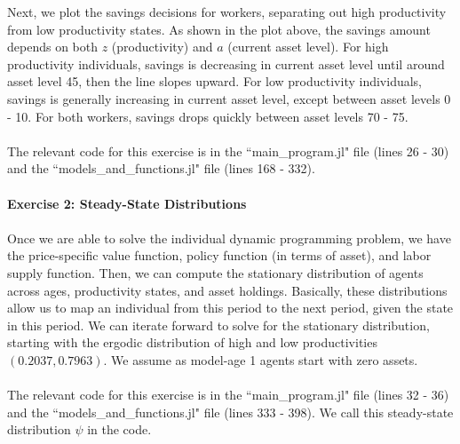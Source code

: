 \documentclass[12pt]{article}
\begin{document}
\noindent Next, we plot the savings decisions for workers, separating out high productivity from low productivity states. As shown in the plot above, the savings amount depends on both $z$ (productivity) and $a$ (current asset level). For high productivity individuals, savings is decreasing in current asset level until around asset level 45, then the line slopes upward. For low productivity individuals, savings is generally increasing in current asset level, except between asset levels 0 - 10. For both workers, savings drops quickly between asset levels 70 - 75. \\\\
The relevant code for this exercise is in the ``main\_program.jl" file (lines 26 - 30) and the ``models\_and\_functions.jl" file (lines 168 - 332).\\\\


\noindent \textbf{Exercise 2: Steady-State Distributions} \\\\ Once we are able to solve the individual dynamic programming problem, we have the price-specific value function, policy function (in terms of asset), and labor supply function. Then, we can compute the stationary distribution of agents across ages, productivity states, and asset holdings. Basically, these distributions allow us to map an individual from this period to the next period, given the state in this period. We can iterate forward to solve for the stationary distribution, starting with the ergodic distribution of high and low productivities $(0.2037, 0.7963)$. We assume as model-age 1 agents start with zero assets. \\\\
The relevant code for this exercise is in the ``main\_program.jl" file (lines 32 - 36) and the ``models\_and\_functions.jl" file (lines 333 - 398). We call this steady-state distribution $\psi$ in the code.\\\\
\end{document}
